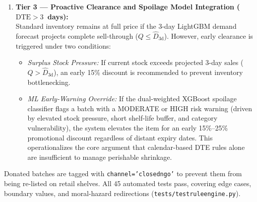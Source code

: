 \documentclass[12pt,a4paper]{article}
\renewcommand{\_}{\oldunderscore\allowbreak}
\begin{document}
\begin{enumerate}[leftmargin=18pt, itemsep=3pt]
    \item \textbf{Tier 3 --- Proactive Clearance and Spoilage Model Integration ($\text{DTE} > 3$~days):}\\
    Standard inventory remains at full price if the 3-day LightGBM demand forecast projects complete sell-through ($Q \le \hat{D}_{\text{3d}}$). However, early clearance is triggered under two conditions:
    \begin{itemize}[leftmargin=14pt, itemsep=1.5pt]
        \item \emph{Surplus Stock Pressure:} If current stock exceeds projected 3-day sales ($Q > \hat{D}_{\text{3d}}$), an early 15\% discount is recommended to prevent inventory bottlenecking.
        \item \emph{ML Early-Warning Override:} If the dual-weighted XGBoost spoilage classifier flags a batch with a MODERATE or HIGH risk warning (driven by elevated stock pressure, short shelf-life buffer, and category vulnerability), the system elevates the item for an early 15\%--25\% promotional discount regardless of distant expiry dates. This operationalizes the core argument that calendar-based DTE rules alone are insufficient to manage perishable shrinkage.
    \end{itemize}
\end{enumerate}

Donated batches are tagged with \texttt{channel='closed\_ngo'} to prevent them from being re-listed on retail shelves. All 45 automated tests pass, covering edge cases, boundary values, and moral-hazard redirections (\texttt{tests/test\_rule\_engine.py}).
\end{document}
